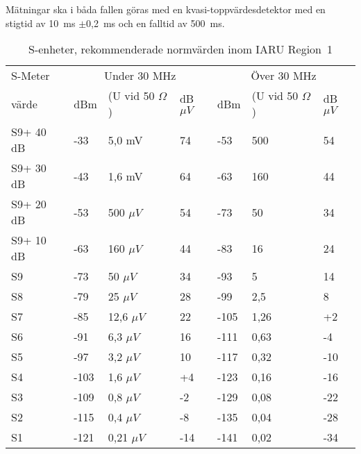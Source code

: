 Mätningar ska i båda fallen göras med en kvasi-toppvärdesdetektor
med en stigtid av 10~ms \(\pm\)0,2~ms och en falltid av 500~ms.

\begin{table}[ht]
  \begin{tabular}{l|lll|lll}
    S-Meter  & \multicolumn{3}{c}{Under 30 MHz} & \multicolumn{3}{c}{Över 30 MHz} \\
    värde    & dBm & (U vid 50 \(\Omega\)) & dB\(\mu V\) & dBm & (U vid 50 \(\Omega\)) & dB\(\mu V\) \\
    \hline
    S9+ 40 dB & -33  & 5,0 mV  & 74  & -53  & 500  & 54  \\
    S9+ 30 dB & -43  & 1,6 mV  & 64  & -63  & 160  & 44  \\
    S9+ 20 dB & -53  & 500 \(\mu V\)  & 54  & -73  & 50   & 34  \\
    S9+ 10 dB & -63  & 160 \(\mu V\)  & 44  & -83  & 16   & 24  \\
    S9        & -73  & 50 \(\mu V\)   & 34  & -93  & 5    & 14  \\
    S8        & -79  & 25 \(\mu V\)   & 28  & -99  & 2,5  & 8   \\
    S7        & -85  & 12,6 \(\mu V\) & 22  & -105 & 1,26 & +2  \\
    S6        & -91  & 6,3 \(\mu V\)  & 16  & -111 & 0,63 & -4  \\
    S5        & -97  & 3,2 \(\mu V\)  & 10  & -117 & 0,32 & -10 \\
    S4        & -103 & 1,6 \(\mu V\)  & +4  & -123 & 0,16 & -16 \\
    S3        & -109 & 0,8 \(\mu V\)  & -2  & -129 & 0,08 & -22 \\
    S2        & -115 & 0,4 \(\mu V\)  & -8  & -135 & 0,04 & -28 \\
    S1        & -121 & 0,21 \(\mu V\) & -14 & -141 & 0,02 & -34 \\
  \end{tabular}
  \caption{S-enheter, rekommenderade normvärden inom IARU Region~1}
  \label{s-enhet tabell}
\end{table}

